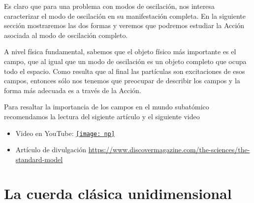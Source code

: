 Es claro que para una problema con modos de oscilación, nos interesa caracterizar el modo de oscilación en su manifestación completa. En la siguiente sección mostraremos las dos formas y veremos que  podremos  estudiar la Acción asociada al modo de oscilación completo.

A nivel física fundamental, sabemos que el objeto físico más importante es el campo, que al igual que un modo de oscilación es un objeto completo que ocupa todo el espacio.
Como resulta que al final las partículas son excitaciones de esos campos, entonces sólo nos tenemos que preocupar de describir los campos y la forma más adecuada es
a través de la Acción.

Para resaltar la importancia de los campos en el mundo subatómico recomendamos la lectura del sigiente artículo y el siguiente video
\begin{itemize}
\item Video en YouTube: \href{kk.org}{\texttt{[image: np]}}
\item Artículo de divulgación \url{https://www.discovermagazine.com/the-sciences/the-standard-model}
\end{itemize}



\section{La cuerda cl\'asica unidimensional}
\label{sec:la-cuerda-clasica}

